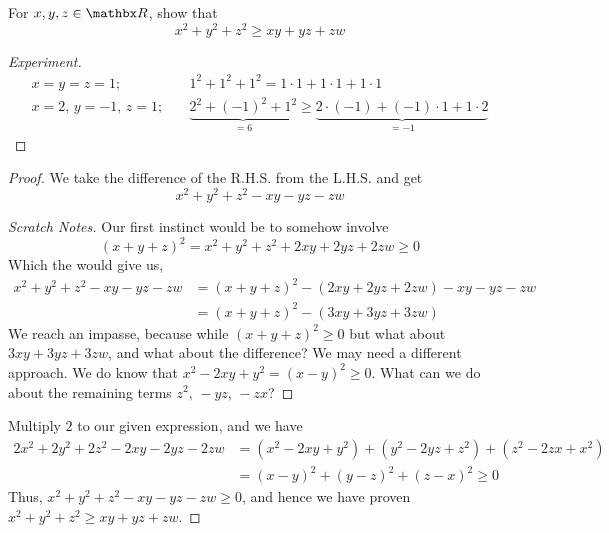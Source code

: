 \begin{example}
For $x, y, z \in \rr$, show that
\[x^2 + y^2 + z^2 \geq xy + yz + zw\]
\end{example}
\begin{proof}[Experiment]
\renewcommand{\qed}{}
\begin{align*}
x = y = z = 1; & \quad 1^2 + 1^2 + 1^2 = 1\cdot 1 + 1\cdot 1 + 1\cdot 1\\[0.5em]
x = 2,\,y = -1,\,z = 1; & \quad \underbrace{2^2 + (-1)^2 + 1^2}_{=6} \geq \underbrace{2\cdot(-1) + (-1)\cdot 1 + 1\cdot 2}_{=-1}
\end{align*}
\end{proof}
\begin{proof}
We take the difference of the $\mathrm{R.H.S.}$ from the $\mathrm{L.H.S.}$ and get
\[x^2 + y^2 + z^2 - xy - yz - zw\]
\vspace*{-0.5em}
\begin{subproof}
\begin{proof}[Scratch Notes]
\renewcommand{\qed}{}
Our first instinct would be to somehow involve 
\[(x + y + z)^2 = x^2 + y^2 + z^2 + 2xy + 2yz + 2zw \geq 0\]
Which the would give us,
\begin{align*}
x^2 + y^2 + z^2 - xy - yz - zw &= (x + y + z)^2 - (2xy + 2yz + 2zw) - xy - yz - zw\\[0.5em]
 &= (x + y + z)^2 - (3xy + 3yz + 3zw)
\end{align*}
We reach an impasse, because while $(x + y + z)^2 \geq 0$ but what about $3xy + 3yz + 3zw$, and what about the difference? We may need a different approach. We do know that $x^2 - 2xy + y^2 = (x - y)^2 \geq 0$. What can we do about the remaining terms $z^2,\,-yz,\,-zx$?
\end{proof}
\end{subproof}
\vspace*{1em}
Multiply $2$ to our given expression, and we have
\begin{align*}
2x^2 + 2y^2 + 2z^2 - 2xy - 2yz - 2zw &= (x^2 - 2xy + y^2) + (y^2 - 2yz + z^2) + (z^2 - 2zx + x^2)\\[0.5em]
 &= (x-y)^2 + (y - z)^2 + (z - x)^2 \geq 0 
\end{align*}
Thus, $x^2 + y^2 + z^2 - xy - yz - zw \geq 0$, and hence we have proven $x^2 + y^2 + z^2 \geq xy + yz + zw$.
\end{proof}


